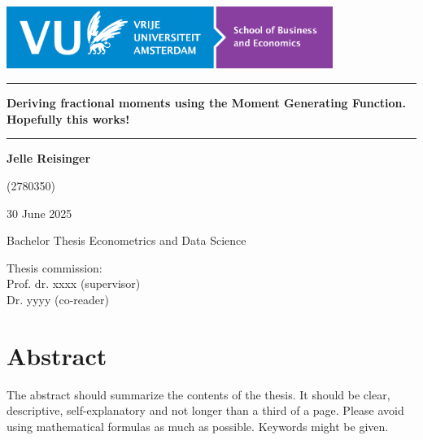 \documentclass[a4paper,11pt]{article}
\theoremstyle{plain}
\theoremstyle{definition}
\begin{document}

\thispagestyle{empty}

\includegraphics[height=2cm]{figures/LogoSBE.png}

\vspace*{3cm}

\noindent
\rule{\textwidth}{0.8pt}
\begin{center}
{\huge\bf
\noindent
Deriving fractional moments using the Moment Generating Function. Hopefully this works!
}
\end{center}

\vspace*{-8pt}
\noindent
\rule{\textwidth}{0.8pt}

\vspace*{2cm}

\begin{center}
{\LARGE\bf
Jelle Reisinger
}

{\Large
\vspace*{0.5cm}
(2780350)


\vspace*{2cm}

30 June 2025
}
\end{center}

\vspace*{2cm}

{\Large
\noindent
Bachelor Thesis Econometrics and Data Science
}

\vspace*{1cm}

{\Large
\noindent
Thesis commission:\\[0.3cm]
Prof. dr. xxxx (supervisor)\\[0.3cm]
Dr. yyyy (co-reader)
}


\newpage

\setcounter{page}{1}

\section*{Abstract}
The abstract should summarize the contents of the thesis.
It should be clear, descriptive, self-explanatory and not longer
than a third of a page. Please avoid using mathematical
formulas as much as possible.
Keywords might be given.
\end{document}
